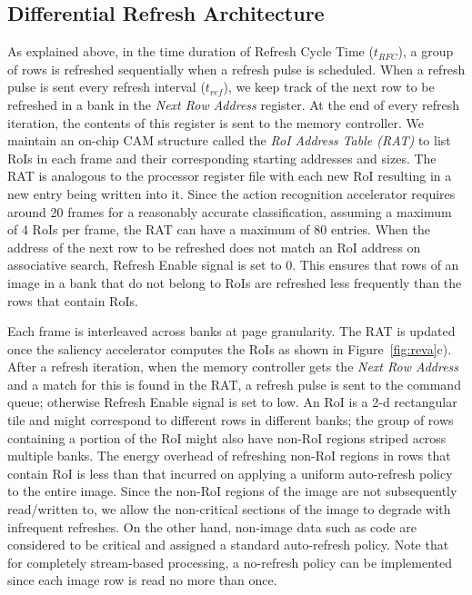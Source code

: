 \subsection{Differential Refresh Architecture}
As explained above, in the time duration of Refresh Cycle Time ($t_{RFC}$), a group of rows is refreshed sequentially when a refresh pulse is scheduled. When a refresh pulse is sent every refresh interval ($t_{ref}$), we keep track of the next row to be refreshed in a bank in the \emph{Next Row Address} register. At the end of every refresh iteration, the contents of this register is sent to the memory controller. 
We maintain an on-chip CAM structure called the \emph{RoI Address Table (RAT)} to list RoIs in each frame and their corresponding starting addresses and sizes. The RAT is analogous to the processor register file with each new RoI resulting in a new entry being written into it. 
Since the action recognition accelerator requires around 20 frames for a reasonably accurate classification, assuming a maximum of 4 RoIs per frame, the RAT can have a maximum of 80 entries. When the address of the next row to be refreshed does not match an RoI address on associative search, Refresh Enable signal is set to 0. This ensures that rows of an image in a bank that do not belong to RoIs are refreshed less frequently than the rows that contain RoIs. 

Each frame is interleaved across banks at page granularity. The RAT is updated once the saliency accelerator computes the RoIs as shown in Figure~\ref{fig:reva}c). After a refresh iteration, when the memory controller gets the \emph{Next Row Address} and a match for this is found in the RAT, a refresh pulse is sent to the command queue; otherwise Refresh Enable signal is set to low. An RoI is a 2-d rectangular tile and might correspond to different rows in different banks; the group of rows containing a portion of the RoI might also have non-RoI regions striped across multiple banks. The energy overhead of refreshing non-RoI regions in rows that contain RoI is less than that incurred on applying a uniform auto-refresh policy to the entire image. Since the non-RoI regions of the image are not subsequently read/written to, we allow the non-critical sections of the image to degrade with infrequent refreshes. On the other hand, non-image data such as code are considered to be critical and assigned a standard auto-refresh policy. Note that for completely stream-based processing, a no-refresh policy can be implemented since each image row is read no more than once.
 
